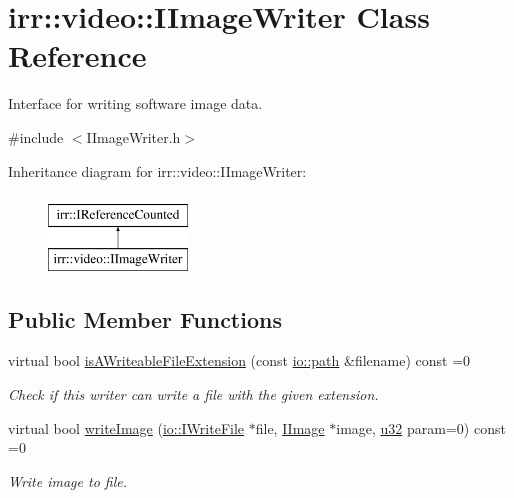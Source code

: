 \hypertarget{classirr_1_1video_1_1IImageWriter}{}\section{irr\+:\+:video\+:\+:I\+Image\+Writer Class Reference}
\label{classirr_1_1video_1_1IImageWriter}


Interface for writing software image data.  




{\ttfamily \#include $<$I\+Image\+Writer.\+h$>$}

Inheritance diagram for irr\+:\+:video\+:\+:I\+Image\+Writer\+:\begin{figure}[H]
\begin{center}
\leavevmode
\includegraphics[height=2.000000cm]{classirr_1_1video_1_1IImageWriter}
\end{center}
\end{figure}
\subsection*{Public Member Functions}
\begin{DoxyCompactItemize}
\item 
virtual bool \hyperlink{classirr_1_1video_1_1IImageWriter_a776f8a7a050572f2144848a86fe6de6b}{is\+A\+Writeable\+File\+Extension} (const \hyperlink{namespaceirr_1_1io_ab1bdc45edb3f94d8319c02bc0f840ee1}{io\+::path} \&filename) const =0
\begin{DoxyCompactList}\small\item\em Check if this writer can write a file with the given extension. \end{DoxyCompactList}\item 
virtual bool \hyperlink{classirr_1_1video_1_1IImageWriter_a0a7f09d1f1613adfe2bfaadc60913f7e}{write\+Image} (\hyperlink{classirr_1_1io_1_1IWriteFile}{io\+::\+I\+Write\+File} $\ast$file, \hyperlink{classirr_1_1video_1_1IImage}{I\+Image} $\ast$image, \hyperlink{namespaceirr_a0416a53257075833e7002efd0a18e804}{u32} param=0) const =0
\begin{DoxyCompactList}\small\item\em Write image to file. \end{DoxyCompactList}\end{DoxyCompactItemize}
